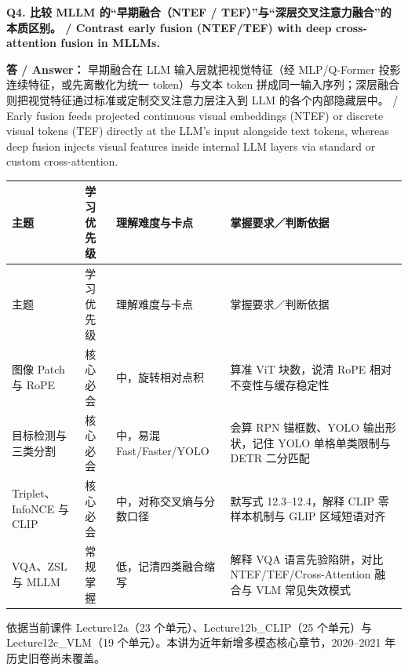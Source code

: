 \textbf{Q4. 比较 MLLM 的“早期融合（NTEF / TEF）”与“深层交叉注意力融合”的本质区别。 / Contrast early fusion (NTEF/TEF) with deep cross-attention fusion in MLLMs.}

\textbf{答 / Answer：} 早期融合在 LLM 输入层就把视觉特征（经 MLP/Q-Former 投影连续特征，或先离散化为统一 token）与文本 token 拼成同一输入序列；深层融合则把视觉特征通过标准或定制交叉注意力层注入到 LLM 的各个内部隐藏层中。 / Early fusion feeds projected continuous visual embeddings (NTEF) or discrete visual tokens (TEF) directly at the LLM's input alongside text tokens, whereas deep fusion injects visual features inside internal LLM layers via standard or custom cross-attention.



\begingroup\small\setlength{\tabcolsep}{3pt}\renewcommand{\arraystretch}{1.22}
\begin{longtable}{@{}>{\raggedright\arraybackslash}p{}>{\raggedright\arraybackslash}p{}>{\raggedright\arraybackslash}p{}>{\raggedright\arraybackslash}p{}@{}}
\toprule
主题 & 学习优先级 & 理解难度与卡点 & 掌握要求／判断依据 \\
\midrule\endfirsthead
主题 & 学习优先级 & 理解难度与卡点 & 掌握要求／判断依据 \\
\midrule\endhead
\bottomrule\endfoot
图像 Patch 与 RoPE & 核心必会 & 中，旋转相对点积 & 算准 ViT 块数，说清 RoPE 相对不变性与缓存稳定性 \\
目标检测与三类分割 & 核心必会 & 中，易混 Fast/Faster/YOLO & 会算 RPN 锚框数、YOLO 输出形状，记住 YOLO 单格单类限制与 DETR 二分匹配 \\
Triplet、InfoNCE 与 CLIP & 核心必会 & 中，对称交叉熵与分数口径 & 默写式 12.3–12.4，解释 CLIP 零样本机制与 GLIP 区域短语对齐 \\
VQA、ZSL 与 MLLM & 常规掌握 & 低，记清四类融合缩写 & 解释 VQA 语言先验陷阱，对比 NTEF/TEF/Cross-Attention 融合与 VLM 常见失效模式 \\
\end{longtable}\endgroup



依据当前课件 Lecture12a（23 个单元）、Lecture12b\_CLIP（25 个单元）与 Lecture12c\_VLM（19 个单元）。本讲为近年新增多模态核心章节，2020–2021 年历史旧卷尚未覆盖。

